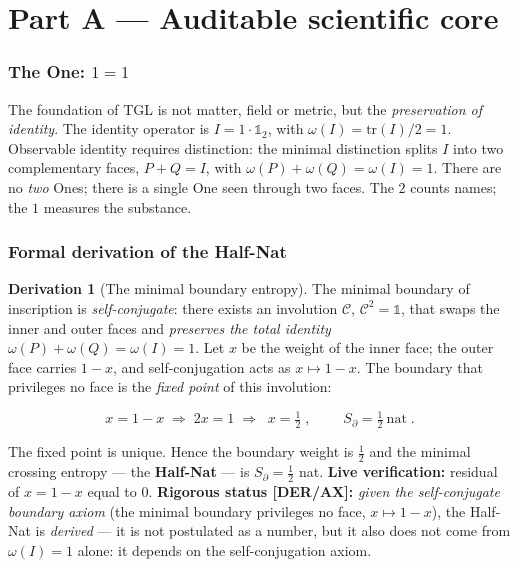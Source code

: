 \documentclass[11pt]{article}
\theoremstyle{definition}\newtheorem{deriv}{Derivation}
\begin{document}
\part{Part A --- Auditable scientific core}

\section{The One: $1=1$}

The foundation of TGL is not matter, field or metric, but the \emph{preservation of identity}. The identity operator is $I=1\cdot\mathbb{1}_2$, with $\omega(I)=\mathrm{tr}(I)/2=1$. Observable identity requires distinction: the minimal distinction splits $I$ into two complementary faces, $P+Q=I$, with $\omega(P)+\omega(Q)=\omega(I)=1$. There are no \emph{two} Ones; there is a single One seen through two faces. The $2$ counts names; the $1$ measures the substance.

\section{Formal derivation of the Half-Nat}

\begin{deriv}[The minimal boundary entropy]

The minimal boundary of inscription is \emph{self-conjugate}: there exists an involution $\mathcal{C}$, $\mathcal{C}^2=\mathbb{1}$, that swaps the inner and outer faces and \emph{preserves the total identity} $\omega(P)+\omega(Q)=\omega(I)=1$. Let $x$ be the weight of the inner face; the outer face carries $1-x$, and self-conjugation acts as $x\mapsto 1-x$. The boundary that privileges no face is the \emph{fixed point} of this involution:

\begin{equation}x=1-x\;\Longrightarrow\;2x=1\;\Longrightarrow\;\boxed{\;x=\tfrac12\;},\qquad\boxed{\;S_\partial=\tfrac12\ \text{nat}\;}.\end{equation}

The fixed point is unique. Hence the boundary weight is $\tfrac12$ and the minimal crossing entropy --- the \textbf{Half-Nat} --- is $S_\partial=\tfrac12$ nat. \textbf{Live verification:} residual of $x=1-x$ equal to $0$. \textbf{Rigorous status \textsf{[DER/AX]}:} \emph{given the self-conjugate boundary axiom} (the minimal boundary privileges no face, $x\mapsto1-x$), the Half-Nat is \emph{derived} --- it is not postulated as a number, but it also does not come from $\omega(I)=1$ alone: it depends on the self-conjugation axiom.\end{deriv}
\end{document}
